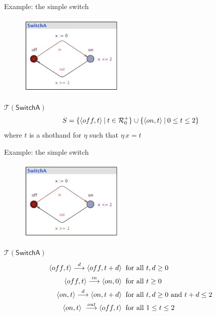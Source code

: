 \documentclass{beamer}
\def\R{\mathcal{R}}
\def\TL#1{\mathcal{T}(#1)}
\begin{document}
\begin{slide}{Example: the simple switch}
\small
\begin{figure}[htb]
  \centering
  \includegraphics[width=5cm]{./images/PASswitchA.jpg}\\
\end{figure}

\begin{block}{$\TL{\mathsf{SwitchA}}$}
\begin{equation*}
S = \setdef{\pair{off,t}}{t \in \R_0^+} \cup \setdef{\pair{on,t}}{0 \leq t \leq 2} 
\end{equation*}
where $t$ is a shothand for $\eta$ such that $\eta\, x = t$
\end{block}

\end{slide}

\begin{slide}{Example: the simple switch}
\small
\begin{figure}[htb]
  \centering
  \includegraphics[width=5cm]{./images/PASswitchA.jpg}\\
\end{figure}

\begin{block}{$\TL{\mathsf{SwitchA}}$}
\vspace{-7mm}
\begin{align*}
\mathopen{\langle}off,t\mathclose{\rangle} \stackrel{d}{\longrightarrow} \mathopen{\langle}off,t+d\mathclose{\rangle}\; & \; \text{for all $t,d \geq 0$}\\
 \mathopen{\langle}off,t\mathclose{\rangle} \stackrel{in}{\longrightarrow} \mathopen{\langle}on,0\mathclose{\rangle}\; & \; \text{for all $t \geq 0$}\\
\mathopen{\langle}on,t\mathclose{\rangle} \stackrel{d}{\longrightarrow} \mathopen{\langle}on,t+d\mathclose{\rangle}\; & \; \text{for all $t,d \geq 0$ and $t+d \leq 2$}\\
\mathopen{\langle}on,t\mathclose{\rangle} \ \stackrel{out}{\longrightarrow} \mathopen{\langle}off,t\mathclose{\rangle}\; & \; \text{for all $1 \leq t \leq 2$}
\end{align*}
\end{block}

\end{slide}
\end{document}
